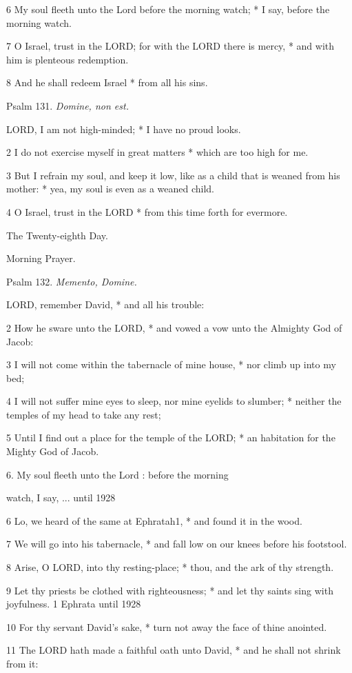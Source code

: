 6 My soul fleeth unto the Lord before the morning watch; * I say, before
the morning watch.

7 O Israel, trust in the LORD; for with the LORD there
is mercy, * and with him is plenteous redemption.

8 And he shall redeem Israel * from all his sins.

Psalm
131. \emph{Domine, non est.}

LORD,
I am not high-minded; * I have no proud looks.

2 I do not exercise myself in great matters * which
are too high for me.

3 But I refrain my soul, and keep it low, like as a
child that is weaned from his mother: * yea, my soul is even as a weaned
child.

4 O Israel, trust in the LORD * from this time forth
for evermore. 

The
Twenty-eighth Day.

Morning
Prayer.

Psalm
132. \emph{Memento, Domine.}

LORD,
remember David, * and all his trouble:

2 How he sware unto the LORD, * and vowed a vow unto
the Almighty God of Jacob:

3 I will not come within the tabernacle of mine house,
* nor climb up into my bed;

4 I will not suffer mine eyes to sleep, nor mine eyelids
to slumber; * neither the temples of my head to take any rest;

5 Until I find out a place for the temple of the LORD;
* an habitation for the Mighty God of Jacob.

6. My soul fleeth unto the
Lord : before the morning

watch, I say, ... until
1928

6 Lo, we heard of the same at Ephratah1, * and found it in the
wood.

7 We will go into his tabernacle, * and fall low on our
knees before his footstool.

8 Arise, O LORD, into thy resting-place; * thou, and
the ark of thy strength.

9 Let thy priests be clothed with righteousness; * and
let thy saints sing with joyfulness. 1
Ephrata until
1928

10 For thy servant David's sake, * turn not away the face of thine anointed.

11 The LORD hath made a faithful oath unto David, * and
he shall not shrink from it:

